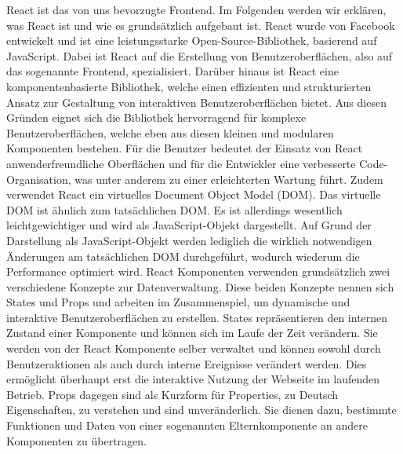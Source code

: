 React ist das von uns bevorzugte Frontend. Im Folgenden werden wir erklären, was React ist und wie es grundsätzlich aufgebaut ist.
React wurde von Facebook entwickelt und ist eine leistungsstarke Open-Source-Bibliothek, basierend auf JavaScript. Dabei ist React auf die Erstellung von Benutzeroberflächen, also auf das sogenannte Frontend, spezialisiert. Darüber hinaus ist React eine komponentenbasierte Bibliothek, welche einen effizienten und strukturierten Ansatz zur Gestaltung von interaktiven Benutzeroberflächen bietet. 
Aus diesen Gründen eignet sich die Bibliothek hervorragend für komplexe Benutzeroberflächen, welche eben aus diesen kleinen und modularen Komponenten bestehen. Für die Benutzer bedeutet der Einsatz von React anwenderfreundliche Oberflächen und für die Entwickler eine verbesserte Code-Organisation, was unter anderem zu einer erleichterten Wartung führt.
Zudem verwendet React ein virtuelles Document Object Model (DOM). Das virtuelle DOM ist ähnlich zum tatsächlichen DOM. Es ist allerdings wesentlich leichtgewichtiger und wird als JavaScript-Objekt dargestellt. Auf Grund der Darstellung als JavaScript-Objekt werden lediglich die wirklich notwendigen Änderungen am tatsächlichen DOM durchgeführt, wodurch wiederum die Performance optimiert wird.
React Komponenten verwenden grundsätzlich zwei verschiedene Konzepte zur Datenverwaltung. Diese beiden Konzepte nennen sich States und Props und arbeiten im Zusammenspiel, um dynamische und interaktive Benutzeroberflächen zu erstellen.
States repräsentieren den internen Zustand einer Komponente und können sich im Laufe der Zeit verändern. Sie werden von der React Komponente selber verwaltet und können sowohl durch Benutzeraktionen als auch durch interne Ereignisse verändert werden. Dies ermöglicht überhaupt erst die interaktive Nutzung der Webseite im laufenden Betrieb.
Props dagegen sind als Kurzform für Properties, zu Deutsch Eigenschaften, zu verstehen und sind unveränderlich. Sie dienen dazu, bestimmte Funktionen und Daten von einer sogenannten Elternkomponente an andere Komponenten zu übertragen.